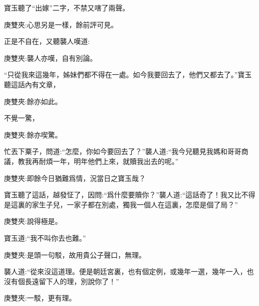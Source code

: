 \begin{parag}
\end{parag}


\begin{parag}
    寶玉聽了“出嫁”二字，不禁又嗐了兩聲。\begin{note}庚雙夾:心思另是一樣，餘前評可見。\end{note}正是不自在，又聽襲人嘆道:\begin{note}庚雙夾:襲人亦嘆，自有別論。\end{note}“只從我來這幾年，姊妹們都不得在一處。如今我要回去了，他們又都去了。”寶玉聽這話內有文章，\begin{note}庚雙夾:餘亦如此。\end{note}不覺一驚，\begin{note}庚雙夾:餘亦喫驚。\end{note}忙丟下粟子，問道:“怎麼，你如今要回去了？”襲人道:“我今兒聽見我媽和哥哥商議，教我再耐煩一年，明年他們上來，就贖我出去的呢。”\begin{note}庚雙夾:即餘今日猶難爲情，況當日之寶玉哉？\end{note}寶玉聽了這話，越發怔了，因問:“爲什麼要贖你？”襲人道:“這話奇了！我又比不得是這裏的家生子兒，一家子都在別處，獨我一個人在這裏，怎麼是個了局？”\begin{note}庚雙夾:說得極是。\end{note}寶玉道:“我不叫你去也難。”\begin{note}庚雙夾:是頭一句駁，故用貴公子聲口，無理。\end{note}襲人道:“從來沒這道理。便是朝廷宮裏，也有個定例，或幾年一選，幾年一入，也沒有個長遠留下人的理，別說你了！”\begin{note}庚雙夾:一駁，更有理。\end{note}
\end{parag}


